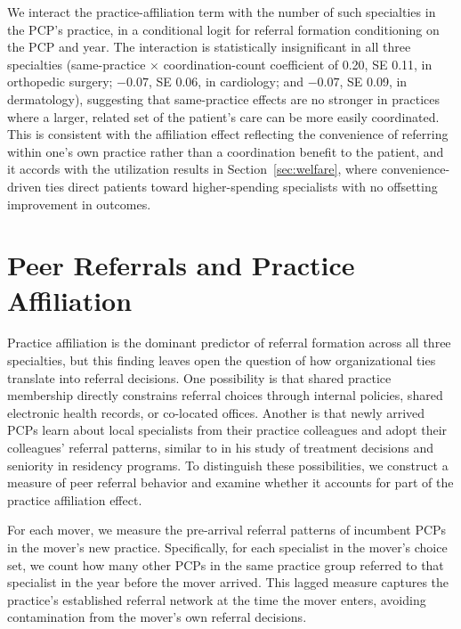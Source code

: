\documentclass[12pt]{article}
\begin{document}
We interact the practice-affiliation term with the number of such specialties in the PCP's practice, in a conditional logit for referral formation conditioning on the PCP and year. The interaction is statistically insignificant in all three specialties (same-practice $\times$ coordination-count coefficient of 0.20, SE 0.11, in orthopedic surgery; $-0.07$, SE 0.06, in cardiology; and $-0.07$, SE 0.09, in dermatology), suggesting that same-practice effects are no stronger in practices where a larger, related set of the patient's care can be more easily coordinated. This is consistent with the affiliation effect reflecting the convenience of referring within one's own practice rather than a coordination benefit to the patient, and it accords with the utilization results in Section~\ref{sec:welfare}, where convenience-driven ties direct patients toward higher-spending specialists with no offsetting improvement in outcomes.


\section{Peer Referrals and Practice Affiliation}
\label{sec:mechanisms}

Practice affiliation is the dominant predictor of referral formation across all three specialties, but this finding leaves open the question of how organizational ties translate into referral decisions. One possibility is that shared practice membership directly constrains referral choices through internal policies, shared electronic health records, or co-located offices. Another is that newly arrived PCPs learn about local specialists from their practice colleagues and adopt their colleagues' referral patterns, similar to \citet{chan2021} in his study of treatment decisions and seniority in residency programs. To distinguish these possibilities, we construct a measure of peer referral behavior and examine whether it accounts for part of the practice affiliation effect.

For each mover, we measure the pre-arrival referral patterns of incumbent PCPs in the mover's new practice. Specifically, for each specialist in the mover's choice set, we count how many other PCPs in the same practice group referred to that specialist in the year before the mover arrived. This lagged measure captures the practice's established referral network at the time the mover enters, avoiding contamination from the mover's own referral decisions.
\end{document}
